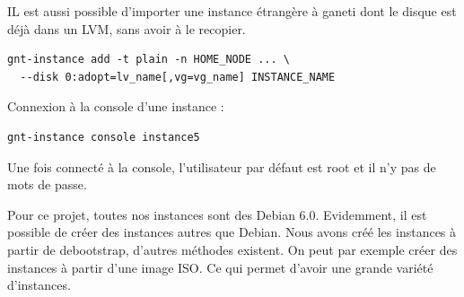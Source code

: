 IL est aussi possible d'importer une instance étrangère à ganeti dont le disque est déjà dans un LVM, sans avoir à le recopier.

\begin{lstlisting}
gnt-instance add -t plain -n HOME_NODE ... \
  --disk 0:adopt=lv_name[,vg=vg_name] INSTANCE_NAME
\end{lstlisting}

Connexion à la console d'une instance :
\begin{lstlisting}
gnt-instance console instance5
\end{lstlisting}
Une fois connecté à la console, l'utilisateur par défaut est root et il n'y pas de mots de passe.

Pour ce projet, toutes nos instances sont des Debian 6.0.
Evidemment, il est possible de créer des instances autres que Debian. Nous avons créé les instances à partir de debootstrap, d'autres méthodes existent.
On peut par exemple créer des instances à partir d'une image ISO. Ce qui permet d'avoir une grande variété d'instances.

